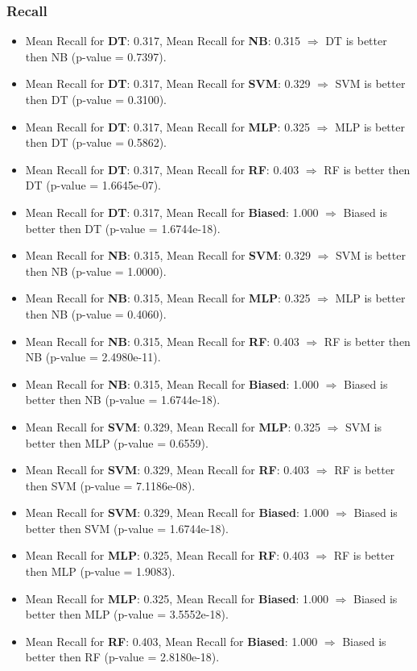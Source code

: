 \documentclass{article}
\begin{document}
\subsubsection{Recall}
\begin{itemize}
    \item Mean Recall for \textbf{DT}: 0.317, Mean Recall for \textbf{NB}: 0.315 $\Rightarrow$ DT is better then NB (p-value = 0.7397).
    \item Mean Recall for \textbf{DT}: 0.317, Mean Recall for \textbf{SVM}: 0.329 $\Rightarrow$ SVM is better then DT (p-value = 0.3100).
    \item Mean Recall for \textbf{DT}: 0.317, Mean Recall for \textbf{MLP}: 0.325 $\Rightarrow$ MLP is better then DT (p-value = 0.5862).
    \item Mean Recall for \textbf{DT}: 0.317, Mean Recall for \textbf{RF}: 0.403 $\Rightarrow$ RF is better then DT (p-value = 1.6645e-07).
    \item Mean Recall for \textbf{DT}: 0.317, Mean Recall for \textbf{Biased}: 1.000 $\Rightarrow$ Biased is better then DT (p-value = 1.6744e-18).
    \item Mean Recall for \textbf{NB}: 0.315, Mean Recall for \textbf{SVM}: 0.329 $\Rightarrow$ SVM is better then NB (p-value = 1.0000).
    \item Mean Recall for \textbf{NB}: 0.315, Mean Recall for \textbf{MLP}: 0.325 $\Rightarrow$ MLP is better then NB (p-value = 0.4060).
    \item Mean Recall for \textbf{NB}: 0.315, Mean Recall for \textbf{RF}: 0.403 $\Rightarrow$ RF is better then NB (p-value = 2.4980e-11).
    \item Mean Recall for \textbf{NB}: 0.315, Mean Recall for \textbf{Biased}: 1.000 $\Rightarrow$ Biased is better then NB (p-value = 1.6744e-18).
    \item Mean Recall for \textbf{SVM}: 0.329, Mean Recall for \textbf{MLP}: 0.325 $\Rightarrow$ SVM is better then MLP (p-value = 0.6559).
    \item Mean Recall for \textbf{SVM}: 0.329, Mean Recall for \textbf{RF}: 0.403 $\Rightarrow$ RF is better then SVM (p-value = 7.1186e-08).
    \item Mean Recall for \textbf{SVM}: 0.329, Mean Recall for \textbf{Biased}: 1.000 $\Rightarrow$ Biased is better then SVM (p-value = 1.6744e-18).
    \item Mean Recall for \textbf{MLP}: 0.325, Mean Recall for \textbf{RF}: 0.403 $\Rightarrow$ RF is better then MLP (p-value = 1.9083).
    \item Mean Recall for \textbf{MLP}: 0.325, Mean Recall for \textbf{Biased}: 1.000 $\Rightarrow$ Biased is better then MLP (p-value = 3.5552e-18).
    \item Mean Recall for \textbf{RF}: 0.403, Mean Recall for \textbf{Biased}: 1.000 $\Rightarrow$ Biased is better then RF (p-value = 2.8180e-18).
\end{itemize}
\end{document}
